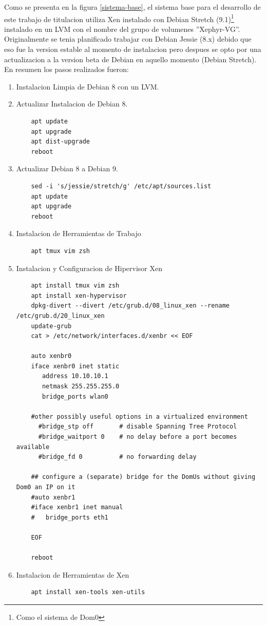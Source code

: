 Como se presenta en la figura \ref{sistema-base}, el sistema base para el desarrollo de este trabajo de titulacion utiliza Xen instalado con Debian Stretch (9.1)\footnote{Como el sistema de Dom0} instalado en un LVM con el nombre del grupo de volumenes ''Xephyr-VG''. Originalmente se tenia planificado trabajar con Debian Jessie (8.x) debido que eso fue la version estable al momento de instalacion pero despues se opto por una actualizacion a la version beta de Debian en aquello momento (Debian Stretch). En resumen los pasos realizados fueron:
\lstset{language=Bash}
\begin{enumerate}
	\item Instalacion Limpia de Debian 8 con un LVM.
    \item Actualizar Instalacion de Debian 8.
    	\begin{lstlisting}
    apt update
    apt upgrade
    apt dist-upgrade
    reboot
        \end{lstlisting}
    \item Actualizar Debian 8 a Debian 9.
        \begin{lstlisting}
    sed -i 's/jessie/stretch/g' /etc/apt/sources.list
    apt update
    apt upgrade
    reboot
        \end{lstlisting}
    \item Instalacion de Herramientas de Trabajo
        \begin{lstlisting}
    apt tmux vim zsh
        \end{lstlisting}
    \item Instalacion y Configuracion de Hipervisor Xen
		\begin{lstlisting}
    apt install tmux vim zsh
    apt install xen-hypervisor
    dpkg-divert --divert /etc/grub.d/08_linux_xen --rename /etc/grub.d/20_linux_xen
    update-grub
    cat > /etc/network/interfaces.d/xenbr << EOF

    auto xenbr0
    iface xenbr0 inet static
       address 10.10.10.1
       netmask 255.255.255.0
       bridge_ports wlan0

    #other possibly useful options in a virtualized environment
      #bridge_stp off       # disable Spanning Tree Protocol
      #bridge_waitport 0    # no delay before a port becomes available
      #bridge_fd 0          # no forwarding delay

    ## configure a (separate) bridge for the DomUs without giving Dom0 an IP on it
    #auto xenbr1
    #iface xenbr1 inet manual
    #   bridge_ports eth1

    EOF

    reboot
		\end{lstlisting}
	\item Instalacion de Herramientas de Xen
		\begin{lstlisting}
	apt install xen-tools xen-utils
		\end{lstlisting}
\end{enumerate}

